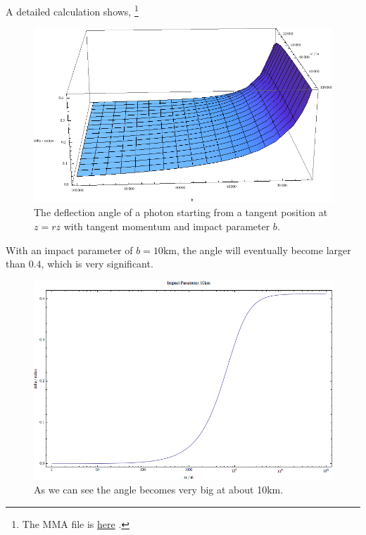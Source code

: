 \documentclass[letterpaper,12pt,english]{sphinxmanual}
\begin{document}
A detailed calculation shows, \footnote{
The MMA file is \href{https://github.com/emptymalei/neutrino/blob/master/MMA/gravitation.nb}{here} .
}
\begin{figure}[htbp]
\centering
\capstart

\includegraphics{gravitationDeflection.png}
\caption{The deflection angle of a photon starting from a tangent position at \(z=rz\) with tangent momentum and impact parameter \(b\).}\end{figure}

With an impact parameter of \(b=10\text{km}\), the angle will eventually become larger than \(0.4\), which is very significant.
\begin{figure}[htbp]
\centering
\capstart

\includegraphics{deflectionAngle.png}
\caption{As we can see the angle becomes very big at about 10km.}\end{figure}
\end{document}
